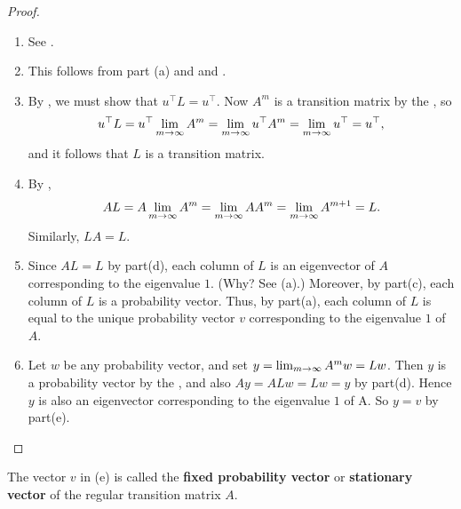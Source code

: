 \begin{proof} \ 

\begin{enumerate}
\item See .
\item This follows from part (a) and  and .

\item By , we must show that \(u^\top L = u^\top\).
Now \(A^m\) is a transition matrix by the , so
\[
    u^\top L = u^\top \lim_{m \to \infty} A^m = \lim_{m \to \infty} u^\top A^m = \lim_{m \to \infty} u^\top = u^\top,
\]
and it follows that \(L\) is a transition matrix.
\item By ,
\[
    AL = A \lim_{m \to \infty} A^m = \lim_{m \to \infty} A A^m = \lim_{m \to \infty} A^{m + 1} = L.
\]
Similarly, \(LA = L\).

\item Since \(AL = L\) by part(d), each column of \(L\) is an eigenvector of \(A\) corresponding to the eigenvalue \(1\).
(Why? See (a).)
Moreover, by part(c), each column of \(L\) is a probability vector.
Thus, by part(a), each column of \(L\) is equal to the unique probability vector \(v\) corresponding to the eigenvalue \(1\) of \(A\).

\item Let \(w\) be any probability vector, and set \(y = \lim_{m \to \infty} A^m w = L w\).
Then \(y\) is a probability vector by the , and also \(A y = A L w = L w = y\) by part(d).
Hence \(y\) is also an eigenvector corresponding to the eigenvalue \(1\) of A.
So \(y = v\) by part(e).
\end{enumerate}
\end{proof}

\begin{definition}
The vector \(v\) in (e) is called the \textbf{fixed probability vector} or \textbf{stationary vector} of the regular transition matrix \(A\).
\end{definition}


